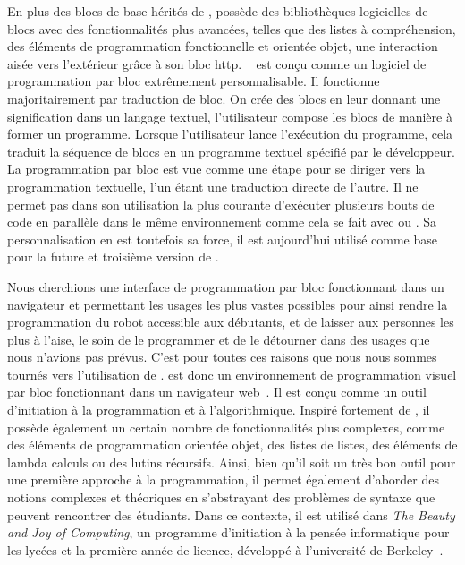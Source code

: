                 En plus des blocs de base hérités de ,  possède des bibliothèques logicielles de blocs avec des fonctionnalités plus avancées, telles que des listes à compréhension, des éléments de programmation fonctionnelle et orientée objet, une interaction aisée vers l'extérieur grâce à son bloc http.
                ~ est conçu comme un logiciel de programmation par bloc extrêmement personnalisable. Il fonctionne majoritairement par traduction de bloc. On crée des blocs en leur donnant une signification dans un langage textuel, l'utilisateur compose les blocs de manière à former un programme. Lorsque l'utilisateur lance l'exécution du programme, cela traduit la séquence de blocs en un programme textuel spécifié par le développeur. La programmation par bloc est vue comme une étape pour se diriger vers la programmation textuelle, l'un étant une traduction directe de l'autre. Il ne permet pas dans son utilisation la plus courante d'exécuter plusieurs bouts de code en parallèle dans le même environnement comme cela se fait avec  ou . Sa personnalisation en est toutefois sa force, il est aujourd'hui utilisé comme base pour la future et troisième version de .\par%
                Nous cherchions une interface de programmation par bloc fonctionnant dans un navigateur et permettant les usages les plus vastes possibles pour ainsi rendre la programmation du robot accessible aux débutants, et de laisser aux personnes les plus à l'aise, le soin de le programmer et de le détourner dans des usages que nous n'avions pas prévus. C'est pour toutes ces raisons que nous nous sommes tournés vers l'utilisation de .
                 est donc un environnement de programmation visuel par bloc fonctionnant dans un navigateur web~. Il est conçu comme un outil d'initiation à la programmation et à l'algorithmique. 
                Inspiré fortement de , il possède également un certain nombre de fonctionnalités plus complexes, comme des éléments de programmation orientée objet, des listes de listes, des éléments de lambda calculs ou des lutins récursifs. Ainsi, bien qu'il soit un très bon outil pour une première approche à la programmation, il permet également d'aborder des notions complexes et théoriques en s'abstrayant des problèmes de syntaxe que peuvent rencontrer des étudiants.
                Dans ce contexte, il est utilisé dans \textit{The Beauty and Joy of Computing}, un programme d'initiation à la pensée informatique pour les lycées et la première année de licence, développé à l'université de Berkeley~.
